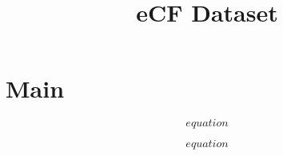 \documentclass{article}
\begin{document}
\title{eCF Dataset}
\section{Main}

\begin{equation}
  equation
\end{equation}

\begin{equation}
  equation
\end{equation}
\end{document}
